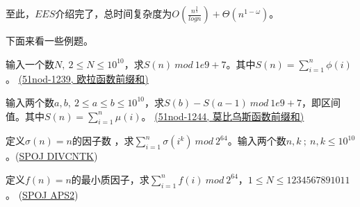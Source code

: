至此，$EES$介绍完了，总时间复杂度为$O(\frac {n^{\frac 3 4}}{ log n})+\Theta(n^{1-\omega})$。

下面来看一些例题。

\vbox{}

\begin{example}
	输入一个数$N,\ 2\le N\le 10^{10}$，求$S(n)\ mod\ 1e9+7$。其中$S(n)=\sum_{i=1}^{n}\phi(i)$。
	\href{https://www.51nod.com/Challenge/Problem.html#problemId=1239}{(51nod-1239, 欧拉函数前缀和)}
\end{example}







\vbox{}





\begin{example}
	输入两个数$a,b,\ 2\le a\le b\le 10^{10}$，求$S(b)-S(a-1)\ mod\ 1e9+7$，即区间值。其中$S(n)=\sum_{i=1}^{n}\mu(i)$。
	\href{https://www.51nod.com/Challenge/Problem.html#problemId=1244}{(51nod-1244, 莫比乌斯函数前缀和)}
\end{example}
 







\vbox{}





\begin{example}
	定义$\sigma(n)=n$的因子数  ，求$\sum_{i=1}^n\sigma(i^k)  \ mod  \ 2^{64}$。输入两个数$n,k\ ;\ n,k \le 10^{10}$。(\href{https://www.spoj.com/problems/DIVCNTK/}{SPOJ DIVCNTK})      
\end{example}
  







\vbox{}




\begin{example}
定义$f(n)=n$的最小质因子，求$\sum_{i=1}^nf(i)   \ mod \ 2^{64}$，$1\le N\le 1234567891011$。   
(\href{https://www.spoj.com/problems/APS2/}{SPOJ APS2})
\end{example}



